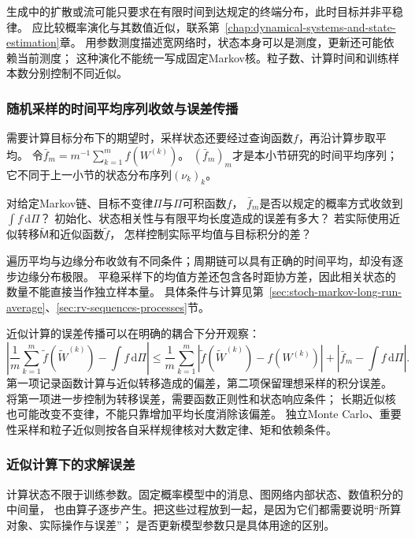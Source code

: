 生成中的扩散或流可能只要求在有限时间到达规定的终端分布，此时目标并非平稳律。
应比较概率演化与其数值近似，联系第~\ref{chap:dynamical-systems-and-state-estimation}章。
用参数测度描述宽网络时，状态本身可以是测度，更新还可能依赖当前测度；
这种演化不能统一写成固定Markov核。粒子数、计算时间和训练样本数分别控制不同近似。

\subsubsection{随机采样的时间平均序列收敛与误差传播}
\label{sec:future-analysis-sampling-average}

需要计算目标分布下的期望时，采样状态还要经过查询函数$f$，再沿计算步取平均。
令$\bar f_m=m^{-1}\sum_{k=1}^m f(W^{(k)})$。
$(\bar f_m)_m$才是本小节研究的时间平均序列；它不同于上一小节的状态分布序列$(\nu_k)_k$。

\begin{mathproblem}[采样时间平均的积分误差]
  \label{question:future-sampling-average}
  对给定Markov链、目标不变律$\Pi$与$\Pi$可积函数$f$，
  $\bar f_m$是否以规定的概率方式收敛到$\int f\,\mathrm d\Pi$？
  初始化、状态相关性与有限平均长度造成的误差有多大？
  若实际使用近似转移$\widetilde{\mathsf M}$和近似函数$\widetilde f$，
  怎样控制实际平均值与目标积分的差？
\end{mathproblem}

遍历平均与边缘分布收敛有不同条件；周期链可以具有正确的时间平均，却没有逐步边缘分布极限。
平稳采样下的均值方差还包含各时距协方差，因此相关状态的数量不能直接当作独立样本量。
具体条件与计算见第~\ref{sec:stoch-markov-long-run-average}、\ref{sec:rv-sequences-processes}节。

近似计算的误差传播可以在明确的耦合下分开观察：
\[
  \left|\frac1m\sum_{k=1}^m\widetilde f(\widetilde W^{(k)})-\int f\,\mathrm d\Pi\right|
  \leq\frac1m\sum_{k=1}^m
    |\widetilde f(\widetilde W^{(k)})-f(W^{(k)})|
    +\left|\bar f_m-\int f\,\mathrm d\Pi\right|.
\]
第一项记录函数计算与近似转移造成的偏差，第二项保留理想采样的积分误差。
将第一项进一步控制为转移误差，需要函数正则性和状态响应条件；
长期近似核也可能改变不变律，不能只靠增加平均长度消除该偏差。
独立Monte Carlo、重要性采样和粒子近似则按各自采样规律核对大数定律、矩和依赖条件。

\subsubsection{近似计算下的求解误差}
\label{sec:future-analysis-computation}

计算状态不限于训练参数。固定概率模型中的消息、图网络内部状态、数值积分的中间量，
也由算子逐步产生。把这些过程放到一起，是因为它们都需要说明“所算对象、实际操作与误差”；
是否更新模型参数只是具体用途的区别。

